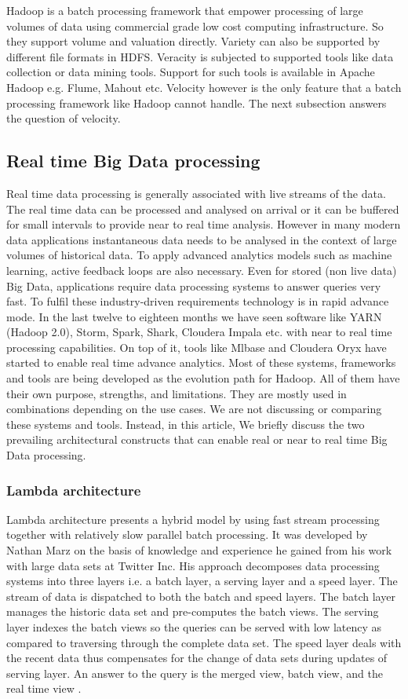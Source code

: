  Hadoop is a batch processing framework that empower processing of large volumes of data using commercial grade low cost computing infrastructure. So they support volume and valuation directly. Variety can also be supported by different file formats in HDFS. Veracity is subjected to supported tools like data collection or data mining tools. Support for such tools is available in Apache Hadoop e.g. Flume, Mahout etc. Velocity however is the only feature that a batch processing framework like Hadoop cannot handle. The next subsection answers the question of velocity.

\subsection{Real time Big Data processing }
Real time data processing is generally associated with live streams of the data. The real time data can be processed and analysed on arrival or it can be buffered for small intervals to provide near to real time analysis. However in many modern data applications instantaneous data needs to be analysed in the context of large volumes of historical data. To apply advanced analytics models such as machine learning, active feedback loops are also necessary.  Even for stored (non live data) Big Data, applications require data processing systems to answer queries very fast. To fulfil these industry-driven requirements technology is in rapid advance mode. In the last twelve to eighteen months we have seen software like YARN (Hadoop 2.0), Storm, Spark, Shark, Cloudera Impala etc. with near to real time processing capabilities. On top of it, tools like Mlbase and Cloudera Oryx have started to enable real time advance analytics. Most of these systems, frameworks and tools are being developed as the evolution path for Hadoop. All of them have their own purpose, strengths, and limitations. They are mostly used in combinations depending on the use cases. We are not discussing or comparing these systems and tools. Instead, in this article, We briefly discuss the two prevailing architectural constructs that can enable real or near to real time Big Data processing.

\subsubsection{ Lambda architecture}
Lambda architecture presents a hybrid model by using fast stream processing together with relatively slow parallel batch processing.  It was developed by Nathan Marz on the basis of knowledge and experience he gained from his work with large data sets at Twitter Inc. His approach decomposes data processing systems into three layers i.e. a batch layer, a serving layer and a speed layer. The stream of data is dispatched to both the batch and speed layers. The batch layer manages the historic data set and pre-computes the batch views. The serving layer indexes the batch views so the queries can be served with low latency as compared to traversing through the complete data set. The speed layer deals with the recent data thus compensates for the change of data sets during updates of serving layer. An answer to the query is the merged view, batch view, and the real time view \cite{marz2013big}\cite{lambdaarch}. 


